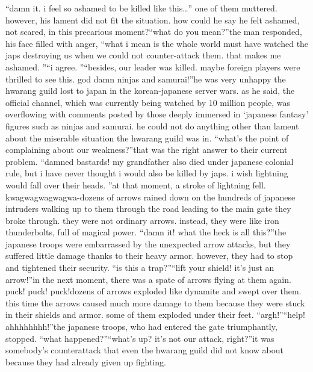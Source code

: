 “damn it.
 i feel so ashamed to be killed like this…” one of them muttered.
however, his lament did not fit the situation.
 how could he say he felt ashamed, not scared, in this precarious moment?“what do you mean?”the man responded, his face filled with anger, “what i mean is the whole world must have watched the japs destroying us when we could not counter-attack them.
 that makes me ashamed.
”“i agree.
”“besides, our leader was killed.
 maybe foreign players were thrilled to see this.
 god damn ninjas and samurai!”he was very unhappy the hwarang guild lost to japan in the korean-japanese server wars.
 as he said, the official channel, which was currently being watched by 10 million people, was overflowing with comments posted by those deeply immersed in ‘japanese fantasy’ figures such as ninjas and samurai.
he could not do anything other than lament about the miserable situation the hwarang guild was in.
“what’s the point of complaining about our weakness?”that was the right answer to their current problem.
“damned bastards! my grandfather also died under japanese colonial rule, but i have never thought i would also be killed by japs.
 i wish lightning would fall over their heads.
”at that moment, a stroke of lightning fell.
kwagwagwagwagwa-dozens of arrows rained down on the hundreds of japanese intruders walking up to them through the road leading to the main gate they broke through.
 they were not ordinary arrows.
 instead, they were like iron thunderbolts, full of magical power.
“damn it! what the heck is all this?”the japanese troops were embarrassed by the unexpected arrow attacks, but they suffered little damage thanks to their heavy armor.
 however, they had to stop and tightened their security.
“is this a trap?”“lift your shield! it’s just an arrow!”in the next moment, there was a spate of arrows flying at them again.
puck! puck! puck!dozens of arrows exploded like dynamite and swept over them.
 this time the arrows caused much more damage to them because they were stuck in their shields and armor.
 some of them exploded under their feet.
“argh!”“help! ahhhhhhhh!”the japanese troops, who had entered the gate triumphantly, stopped.
“what happened?”“what’s up? it’s not our attack, right?”it was somebody’s counterattack that even the hwarang guild did not know about because they had already given up fighting.


